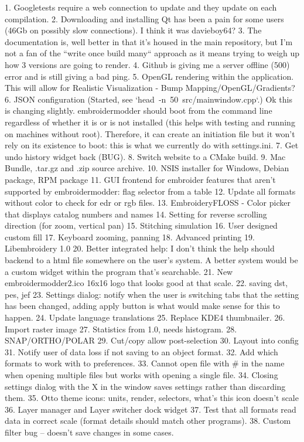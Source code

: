 \documentclass[a4paper]{report}
\begin{document}
{{{{{{1. Googletests require a web connection to update and they update on each compilation.
2. Downloading and installing Qt has been a pain for some users (46Gb on possibly slow connections). I think it was davieboy64?
3. The documentation is, well better in that it's housed in the main repository, but I'm not a fan of the ``write once build many`` approach as it means trying to weigh up how 3 versions are going to render.
4. Github is giving me a server offline (500) error and is still giving a bad ping.
5. OpenGL rendering within the application. This will allow for Realistic Visualization - Bump Mapping/OpenGL/Gradients?
6. JSON configuration (Started, see `head\ -n\ 50\ src/mainwindow.cpp`.) Ok this is changing slightly. embroidermodder should boot from the command line regardless of whether it is or is not installed (this helps with testing and running on machines without root). Therefore, it can create an initiation file but it won't rely on its existence to boot: this is what we currently do with settings.ini.
7.  Get undo history widget back (BUG).
8.  Switch website to a CMake build.
9.  Mac Bundle, .tar.gz and .zip source archive.
10.  NSIS installer for Windows, Debian package, RPM package
11.  GUI frontend for embroider features that aren't supported by embroidermodder: flag selector from a table
12.  Update all formats without color to check for edr or rgb files.
13.  EmbroideryFLOSS - Color picker that displays catalog numbers and names
14.  Setting for reverse scrolling direction (for zoom, vertical pan)
15. Stitching simulation
16.  User designed custom fill
17.  Keyboard zooming, panning
18.  Advanced printing
19.  Libembroidery 1.0
20. Better integrated help: I don't think the help should backend to a html file somewhere on the user's system. A better system would be a custom widget within the program that's searchable.
21. New embroidermodder2.ico 16x16 logo that looks good at that scale.
22. saving dst, pes, jef
23. Settings dialog: notify when the user is switching tabs that the setting has been changed, adding apply button is what would make sense for this to happen.
24.  Update language translations
25.  Replace KDE4 thumbnailer.
26.  Import raster image
27.  Statistics from 1.0, needs histogram.
28.  SNAP/ORTHO/POLAR
29.  Cut/copy allow post-selection
30.  Layout into config
31.  Notify user of data loss if not saving to an object format.
32.  Add which formats to work with to preferences.
33.  Cannot open file with \# in the name when opening multiple files but works with opening a single file.
34.  Closing settings dialog with the X in the window saves settings rather than discarding them.
35. Otto theme icons: units, render, selectors, what's this icon doesn't  scale
36. Layer manager and Layer switcher dock widget
37. Test that all formats read data in correct scale (format details should match other programs).
38.  Custom filter bug -- doesn't save changes in some cases.

}}}}}}
\end{document}
